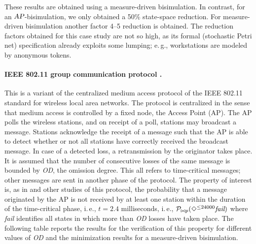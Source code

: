 \documentclass{llncs}
\begin{document}
%
\noindent These results are obtained using a measure-driven bisimulation.
In contrast, for an $\mbox{\sl AP}$-bisimulation, we only obtained a 50\% state-space reduction.
For measure-driven bisimulation another factor 4--5 reduction is obtained.
	The reduction factors obtained for this case study are not so high,
	as its formal (stochastic Petri net) specification already exploits some lumping;
	e.\,g.\@, workstations are modeled by anonymous tokens.

\paragraph{IEEE 802.11 group communication protocol \cite{MassinkKL_DSN04}.}
This is a variant of the centralized medium access protocol of the IEEE 802.11 standard 
for wireless local area networks.  
The protocol is centralized in the sense that medium access is controlled by a fixed node, the Access Point (AP).  
The AP polls the wireless stations, and on receipt of a poll, stations may broadcast 
a message.  
Stations acknowledge the receipt of a message such that the AP is able to detect whether or
not all stations have correctly received the broadcast message.  
In case of a detected loss, a retransmission by the originator takes place.  
It is assumed that the number of consecutive losses of the same message is bounded by {\it OD}, 
the omission degree.   
This all refers to time-critical messages; other messages are sent in another 
phase of the protocol.  
The property of interest is, as in \cite{MassinkKL_DSN04} and other studies of this protocol, the probability that a message originated by the AP is not received by at
least one station within the duration of the time-critical phase, i.\,e., $t=2.4$ milliseconds, i.\,e.,
${\cal P}_{\bowtie p}(\Diamond^{\leq 24000} \mbox{\it fail})$ where {\it fail} identifies all states
in which more than {\it OD} losses have taken place. 
The following table reports the results for the verification of this property for different values of 
{\it OD} and the minimization results for a measure-driven bisimulation.
\end{document}
